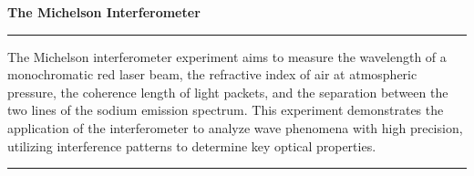 
\par
\begin{center}
{\Large\textbf{The Michelson Interferometer}}


    
\par\noindent\rule{\textwidth}{0.4pt}


The Michelson interferometer experiment aims to measure the wavelength of a monochromatic red laser beam, the refractive index of air at atmospheric pressure, the coherence length of light packets, and the separation between the two lines of the sodium emission spectrum. This experiment demonstrates the application of the interferometer to analyze wave phenomena with high precision, utilizing interference patterns to determine key optical properties.
    
    
    \par\noindent\rule{\textwidth}{0.4pt}
\end{center}

